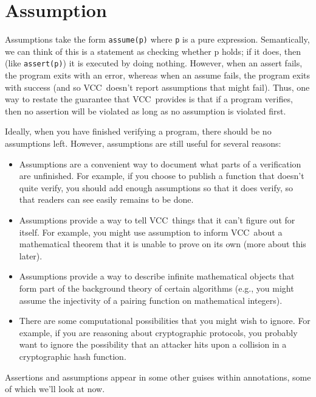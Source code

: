 \documentclass{report}
\newcommand{\Q}[1]{\lstinline~#1~}
\newcommand{\VCC}{VCC}
\begin{document}
\section{Assumption}
Assumptions take the form \Q{assume(p)} where \Q{p} is a pure
expression. Semantically, we can think of this is a statement as
checking whether p holds; if it does, then (like \Q{assert(p)}) it is
executed by doing nothing. However, when an assert fails, the program
exits with an error, whereas when an assume fails, the program exits
with success (and so \VCC\ doesn't report assumptions that might
fail). Thus, one way to restate the guarantee that \VCC\ provides is
that if a program verifies, then no assertion will be violated as long
as no assumption is violated first.

Ideally, when you have finished verifying a program, there should be
no assumptions left. However, assumptions are still useful for several
reasons:

\begin{itemize}
\item
Assumptions are a convenient way to document what parts of a
verification are unfinished. For example, if you choose to publish a
function that doesn't quite verify, you should add enough assumptions
so that it does verify, so that readers can see easily remains to be
done.
\item
Assumptions provide a way to tell \VCC\ things that it can't figure out
for itself. For example, you might use assumption to inform \VCC\ about
a mathematical theorem that it is unable to prove on its own (more
about this later).
\item
Assumptions provide a way to describe infinite mathematical objects
that form part of the background theory of certain algorithms (e.g.,
you might assume the injectivity of a pairing function on mathematical
integers).
\item
There are some computational possibilities that you might wish to
ignore. For example, if you are reasoning about cryptographic
protocols, you probably want to ignore the possibility that an
attacker hits upon a collision in a cryptographic hash function.
\end{itemize}

Assertions and assumptions appear in some other guises within
annotations, some of which we'll look at now.
\end{document}
